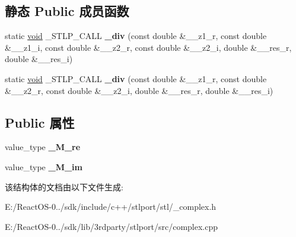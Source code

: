 \subsection*{静态 Public 成员函数}
\begin{DoxyCompactItemize}
\item 
\mbox{\label{structcomplex_3_01double_01_4_a6f159ee0db82ac8b6ac68b87591b3430}} 
static \hyperlink{interfacevoid}{void} \+\_\+\+S\+T\+L\+P\+\_\+\+C\+A\+LL {\bfseries \+\_\+div} (const double \&\+\_\+\+\_\+z1\+\_\+r, const double \&\+\_\+\+\_\+z1\+\_\+i, const double \&\+\_\+\+\_\+z2\+\_\+r, const double \&\+\_\+\+\_\+z2\+\_\+i, double \&\+\_\+\+\_\+res\+\_\+r, double \&\+\_\+\+\_\+res\+\_\+i)
\item 
\mbox{\label{structcomplex_3_01double_01_4_a899eef3ccb03ba5171d81d8660f80748}} 
static \hyperlink{interfacevoid}{void} \+\_\+\+S\+T\+L\+P\+\_\+\+C\+A\+LL {\bfseries \+\_\+div} (const double \&\+\_\+\+\_\+z1\+\_\+r, const double \&\+\_\+\+\_\+z2\+\_\+r, const double \&\+\_\+\+\_\+z2\+\_\+i, double \&\+\_\+\+\_\+res\+\_\+r, double \&\+\_\+\+\_\+res\+\_\+i)
\end{DoxyCompactItemize}
\subsection*{Public 属性}
\begin{DoxyCompactItemize}
\item 
\mbox{\label{structcomplex_3_01double_01_4_ad47cdefc6736ba07e34d8467f6f96edd}} 
value\+\_\+type {\bfseries \+\_\+\+M\+\_\+re}
\item 
\mbox{\label{structcomplex_3_01double_01_4_a2816ef6b152484f663b1d141e2dbba67}} 
value\+\_\+type {\bfseries \+\_\+\+M\+\_\+im}
\end{DoxyCompactItemize}


该结构体的文档由以下文件生成\+:\begin{DoxyCompactItemize}
\item 
E\+:/\+React\+O\+S-\/0../sdk/include/c++/stlport/stl/\+\_\+complex.\+h\item 
E\+:/\+React\+O\+S-\/0../sdk/lib/3rdparty/stlport/src/complex.\+cpp\end{DoxyCompactItemize}
